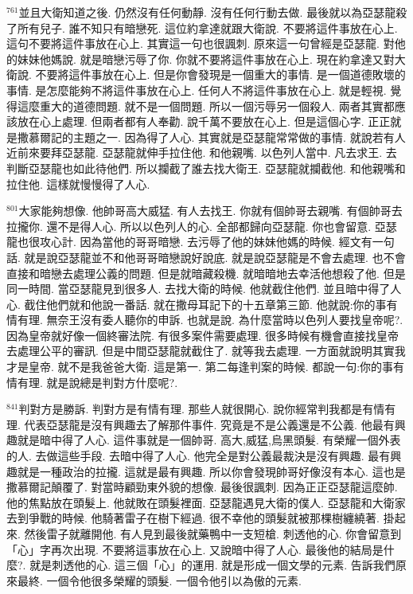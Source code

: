 \documentclass{book}
\begin{document}
$^{761}$並且大衛知道之後.
仍然沒有任何動靜.
沒有任何行動去做.
最後就以為亞瑟龍殺了所有兒子.
誰不知只有暗戀死.
這位約拿達就跟大衛說.
不要將這件事放在心上.
這句不要將這件事放在心上.
其實這一句也很諷刺.
原來這一句曾經是亞瑟龍.
對他的妹妹他媽說.
就是暗戀污辱了你.
你就不要將這件事放在心上.
現在約拿達又對大衛說.
不要將這件事放在心上.
但是你會發現是一個重大的事情.
是一個道德敗壞的事情.
是怎麼能夠不將這件事放在心上.
任何人不將這件事放在心上.
就是輕視.
覺得這麼重大的道德問題.
就不是一個問題.
所以一個污辱另一個殺人.
兩者其實都應該放在心上處理.
但兩者都有人奉勸.
說千萬不要放在心上.
但是這個心字.
正正就是撒慕爾記的主題之一.
因為得了人心.
其實就是亞瑟龍常常做的事情.
就說若有人近前來要拜亞瑟龍.
亞瑟龍就伸手拉住他.
和他親嘴.
以色列人當中.
凡去求王.
去判斷亞瑟龍也如此待他們.
所以攔截了誰去找大衛王.
亞瑟龍就攔截他.
和他親嘴和拉住他.
這樣就慢慢得了人心.

$^{801}$大家能夠想像.
他帥哥高大威猛.
有人去找王.
你就有個帥哥去親嘴.
有個帥哥去拉攏你.
還不是得人心.
所以以色列人的心.
全部都歸向亞瑟龍.
你也會留意.
亞瑟龍也很攻心計.
因為當他的哥哥暗戀.
去污辱了他的妹妹他媽的時候.
經文有一句話.
就是說亞瑟龍並不和他哥哥暗戀說好說底.
就是說亞瑟龍是不會去處理.
也不會直接和暗戀去處理公義的問題.
但是就暗藏殺機.
就暗暗地去幸活他想殺了他.
但是同一時間.
當亞瑟龍見到很多人.
去找大衛的時候.
他就截住他們.
並且暗中得了人心.
截住他們就和他說一番話.
就在撒母耳記下的十五章第三節.
他就說:你的事有情有理.
無奈王沒有委人聽你的申訴.
也就是說.
為什麼當時以色列人要找皇帝呢?.
因為皇帝就好像一個終審法院.
有很多案件需要處理.
很多時候有機會直接找皇帝去處理公平的審訊.
但是中間亞瑟龍就截住了.
就等我去處理.
一方面就說明其實我才是皇帝.
就不是我爸爸大衛.
這是第一.
第二每逢判案的時候.
都說一句:你的事有情有理.
就是說總是判對方什麼呢?.

$^{841}$判對方是勝訴.
判對方是有情有理.
那些人就很開心.
說你經常判我都是有情有理.
代表亞瑟龍是沒有興趣去了解那件事件.
究竟是不是公義還是不公義.
他最有興趣就是暗中得了人心.
這件事就是一個帥哥.
高大,威猛,烏黑頭髮.
有榮耀一個外表的人.
去做這些手段.
去暗中得了人心.
他完全是對公義最裁決是沒有興趣.
最有興趣就是一種政治的拉攏.
這就是最有興趣.
所以你會發現帥哥好像沒有本心.
這也是撒慕爾記顛覆了.
對當時顧勁東外貌的想像.
最後很諷刺.
因為正正亞瑟龍這麼帥.
他的焦點放在頭髮上.
他就敗在頭髮裡面.
亞瑟龍遇見大衛的僕人.
亞瑟龍和大衛家去到爭戰的時候.
他騎著雷子在樹下經過.
很不幸他的頭髮就被那棵樹纏繞著.
掛起來.
然後雷子就離開他.
有人見到最後就藥鴨中一支短槍.
刺透他的心.
你會留意到「心」字再次出現.
不要將這事放在心上.
又說暗中得了人心.
最後他的結局是什麼?.
就是刺透他的心.
這三個「心」的運用.
就是形成一個文學的元素.
告訴我們原來最終.
一個令他很多榮耀的頭髮.
一個令他引以為傲的元素.
\end{document}
